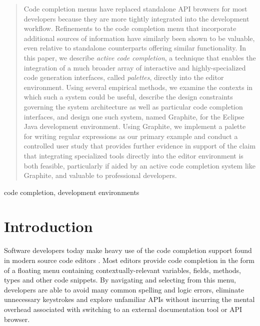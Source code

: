 \documentclass[10pt, conference, compsocconf]{IEEEtran}
\begin{document}
\begin{abstract}
Code completion menus have replaced standalone API browsers for most developers because they are more tightly  integrated into the development workflow. Refinements to the code completion menu that incorporate additional sources of information have similarly been shown to be valuable, even relative to standalone counterparts offering similar functionality. In this paper, we describe {\em active code completion}, a technique that enables the integration of a much broader array of interactive and highly-specialized code generation interfaces, called {\em palettes}, directly into the editor environment. Using several empirical methods, we examine the contexts in which such a system could be useful, describe the design constraints governing the system architecture as well as particular code completion interfaces, and design one such system, named Graphite, for the Eclipse Java development environment. Using Graphite, we implement a palette for writing regular expressions as our primary  example and conduct a controlled user study that provides further evidence in support of the claim that integrating specialized tools directly into the editor environment is both feasible, particularly if aided by an  active code completion system like Graphite, and valuable to professional developers.
\end{abstract}

\begin{IEEEkeywords}
code completion, development environments

\end{IEEEkeywords}


%
\IEEEpeerreviewmaketitle
\section{Introduction}
Software developers today make heavy use of the code completion support found in modern source code editors  \cite{murphy_how_2006}. Most editors provide code completion in the form of a floating menu containing  contextually-relevant variables, fields, methods, types and other code snippets. By navigating and selecting from this menu, developers are able to avoid many common spelling and logic errors, eliminate unnecessary keystrokes and explore unfamiliar APIs without incurring the mental overhead associated with switching to an external documentation tool or API browser.
\end{document}
